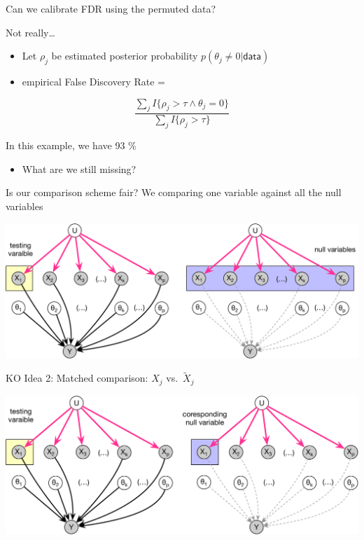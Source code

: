 \documentclass[
  ignorenonframetext,
  aspectratio=169]{beamer}
\providecommand{\tightlist}{%
  \setlength{\itemsep}{0pt}\setlength{\parskip}{0pt}}
\begin{document}
\begin{frame}{Can we calibrate FDR using the permuted data?}
\protect\hypertarget{can-we-calibrate-fdr-using-the-permuted-data-1}{}
\large

Not really\ldots{}

\begin{itemize}
\item
  Let \(\rho_{j}\) be estimated posterior probability
  \(p(\theta_{j} \neq 0|\textsf{data})\)
\item
  empirical False Discovery Rate =
\end{itemize}

\[\frac{\sum_{j} I\{\rho_{j} > \tau \wedge \theta_{j} = 0 \}}{\sum_{j} I\{ \rho_{j} > \tau \}}\]

\scriptsize

\normalsize

In this example, we have 93 \%

\begin{itemize}
\tightlist
\item
  What are we still missing?
\end{itemize}
\end{frame}

\begin{frame}{Is our comparison scheme fair? We comparing one variable
against all the null variables}
\protect\hypertarget{is-our-comparison-scheme-fair-we-comparing-one-variable-against-all-the-null-variables}{}
\scriptsize

\begin{center}\includegraphics[width=.8\textwidth]{Vis/Knockoff4} \end{center}

\normalsize
\end{frame}

\begin{frame}{KO Idea 2: Matched comparison: \(X_{j}\)
vs.~\(\tilde{X}_{j}\)}
\protect\hypertarget{ko-idea-2-matched-comparison-x_j-vs.-tildex_j}{}
\scriptsize

\begin{center}\includegraphics[width=.8\textwidth]{Vis/Knockoff5} \end{center}

\normalsize
\end{frame}
\end{document}

